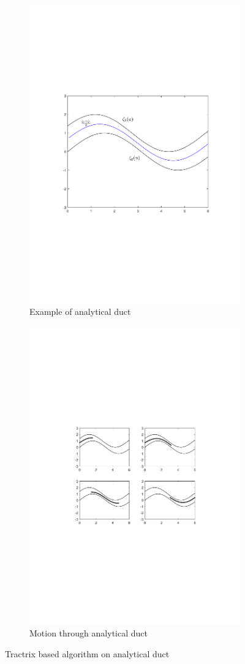 \documentclass[12pt,a4]{article}
\begin{document}
\begin{figure}[ht!]
    \centering
    \begin{subfigure}{0.48\textwidth}
        \centering
        \includegraphics[width=0.75\linewidth]{figures/fig11.pdf}
        \caption{Example of analytical duct \label{fig:analyticduct}}
    \end{subfigure}%
    \begin{subfigure}{0.48\textwidth}
        \centering
        \includegraphics[width=0.75\linewidth]{figures/fig12.pdf}
        \caption{Motion through analytical duct \label{fig:analyticductmotion}}
    \end{subfigure}
    \caption{ Tractrix based algorithm on analytical duct}
\end{figure}
\end{document}
